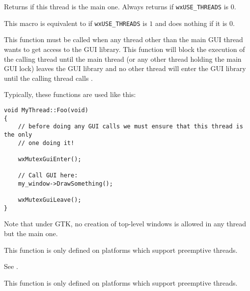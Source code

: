 \label{wxismainthread}


Returns \true if this thread is the main one. Always returns \true if
{\tt wxUSE\_THREADS} is $0$.



\label{wxleavecritsect}


This macro is equivalent to  if
{\tt wxUSE\_THREADS} is $1$ and does nothing if it is $0$.



\label{wxmutexguienter}


This function must be called when any thread other than the main GUI thread
wants to get access to the GUI library. This function will block the execution
of the calling thread until the main thread (or any other thread holding the
main GUI lock) leaves the GUI library and no other thread will enter the GUI
library until the calling thread calls .

Typically, these functions are used like this:

\begin{verbatim}
void MyThread::Foo(void)
{
    // before doing any GUI calls we must ensure that this thread is the only
    // one doing it!

    wxMutexGuiEnter();

    // Call GUI here:
    my_window->DrawSomething();

    wxMutexGuiLeave();
}
\end{verbatim}

Note that under GTK, no creation of top-level windows is allowed in any
thread but the main one.

This function is only defined on platforms which support preemptive
threads.


\label{wxmutexguileave}


See .

This function is only defined on platforms which support preemptive
threads.



